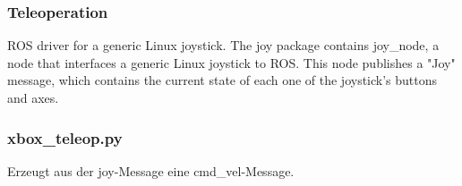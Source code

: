 \begin{comment}
--------------------------------------------------------------------------------
- http://wiki.ros.org/teleop_twist_joy
- http://yardbot.ca/2014/10/writing-custom-joystick-teleop-node-ros/

<node pkg="joy" type="joy_node" name="joy_node" output="screen">
	<param name="dev" type="string" value="/dev/input/js0" />
</node>

Published Topics
- joy (joy/Joy): Outputs the joystick state.
- joy (sensor_msgs/Joy): Outputs the joystick state.

Parameters
~dev (string, default: /dev/input/js0): Linux joystick device from which to read joystick events.
~autorepeat_rate (double, default: 0.0 (disabled)): Rate in Hz at which a joystick that has a non-changing state will resend the previously sent message.

\end{comment}
\subsubsection{Teleoperation}


ROS driver for a generic Linux joystick. The joy package contains joy\_node, a node that interfaces a generic Linux joystick to ROS. This node publishes a "Joy" message, which contains the current state of each one of the joystick's buttons and axes.





\begin{comment}
--------------------------------------------------------------------------------
rospy.Subscriber('joy', Joy, callback)

# TurtleSim commands
# http://wiki.ros.org/ROS/Tutorials/UnderstandingTopics
pub = rospy.Publisher('/cmd_vel', Twist, queue_size=60)
\end{comment}
\subsubsection{xbox\_teleop.py}

Erzeugt aus der joy-Message eine cmd\_vel-Message.





\begin{comment}
--------------------------------------------------------------------------------
A ROS driver for the SICK TiM series of laser scanners.
Auslesen des 2D-LiDAR-Sensors und erstellen einer 
TIM571-2050101 (P/N 1075091); frequency: 15 Hz, angular resolution: 0.333°, range: 25m; see sick_tim571_2050101.launch

scan (sensor_msgs/LaserScan): The published laser scans.

~frame_id (str, default: laser): The TF frame in which laser scans will be returned.
\end{comment}
